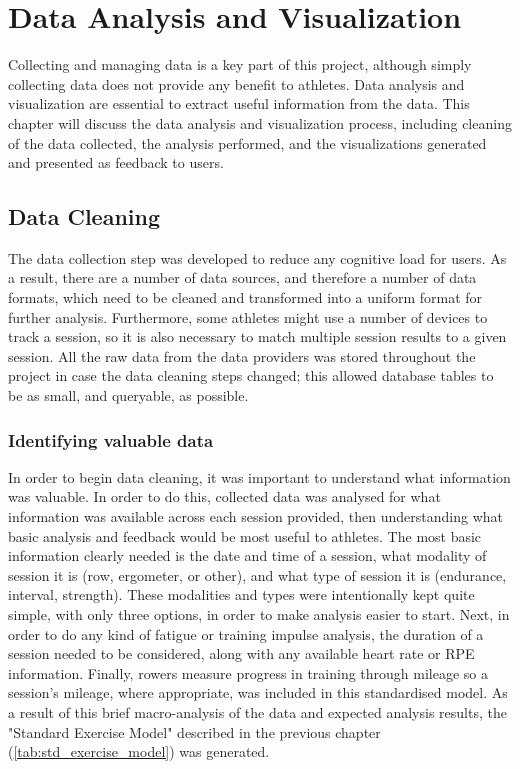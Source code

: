 \chapter{Data Analysis and Visualization} \label{chap:data-analysis-viz}
Collecting and managing data is a key part of this project, although simply collecting data does not provide any benefit to athletes. Data analysis and visualization are essential to extract useful information from the data. This chapter will discuss the data analysis and visualization process, including cleaning of the data collected, the analysis performed, and the visualizations generated and presented as feedback to users.

\section{Data Cleaning}\label{sec:data-cleaning}
The data collection step was developed to reduce any cognitive load for users. As a result, there are a number of data sources, and therefore a number of data formats, which need to be cleaned and transformed into a uniform format for further analysis. Furthermore, some athletes might use a number of devices to track a session, so it is also necessary to match multiple session results to a given session. All the raw data from the data providers was stored throughout the project in case the data cleaning steps changed; this allowed database tables to be as small, and queryable, as possible.
\subsection{Identifying valuable data}
In order to begin data cleaning, it was important to understand what information was valuable. In order to do this, collected data was analysed for what information was available across each session provided, then understanding what basic analysis and feedback would be most useful to athletes. The most basic information clearly needed is the date and time of a session, what modality of session it is (row, ergometer, or other), and what type of session it is (endurance, interval, strength). These modalities and types were intentionally kept quite simple, with only three options, in order to make analysis easier to start. Next, in order to do any kind of fatigue or training impulse analysis, the duration of a session needed to be considered, along with any available heart rate or RPE information. Finally, rowers measure progress in training through mileage so a session's mileage, where appropriate, was included in this standardised model. As a result of this brief macro-analysis of the data and expected analysis results, the "Standard Exercise Model" described in the previous chapter (\autoref{tab:std_exercise_model}) was generated.

